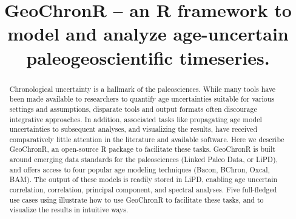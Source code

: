 \documentclass[gchron, manuscript]{copernicus}
\begin{document}
\title{GeoChronR -- an R framework to model and analyze age-uncertain paleogeoscientific timeseries.}














\received{}
\pubdiscuss{} %
\revised{}
\accepted{}
\published{}




\maketitle


\begin{abstract}
Chronological uncertainty is a hallmark of the paleosciences. While many tools have been made available to researchers to quantify age uncertainties suitable for various settings and assumptions, disparate tools and output formats often discourage integrative approaches. In addition, associated tasks like propagating age model uncertainties to subsequent analyses, and visualizing the results, have received comparatively little attention in the literature and available software. Here we describe GeoChronR, an open-source R package to facilitate these tasks. GeoChronR is built around emerging data standards for the paleosciences (Linked Paleo Data, or LiPD), and offers access to four popular age modeling techniques (Bacon, BChron, Oxcal, BAM). The output of these models is readily stored in LiPD, enabling age uncertain correlation, correlation, principal component, and spectral analyses. Five full-fledged use cases using illustrate how to use GeoChronR to facilitate these tasks, and to visualize the results in intuitive ways.
\end{abstract}
\end{document}
